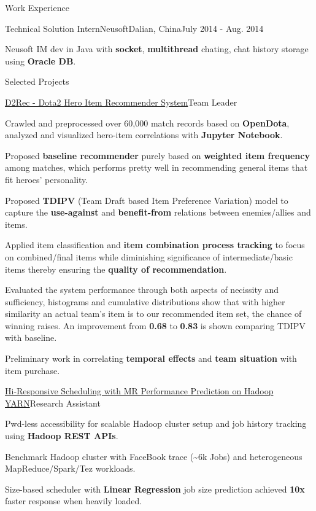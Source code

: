 \documentclass{resume} %
\begin{document}
\begin{rSection}{Work Experience}
\begin{rSubsection}{Technical Solution Intern}{Neusoft}{Dalian, China}{July 2014 - Aug. 2014}
\item Neusoft IM dev in Java with \textbf{socket}, \textbf{multithread} chating, chat history storage using \textbf{Oracle DB}.
\end{rSubsection}
\end{rSection}



\begin{rSection}{Selected Projects}
\begin{rSubsection}{\href{http://dota2rec.github.io}{D2Rec - Dota2 Hero Item Recommender System}}{Team Leader}{}{}
\item Crawled and preprocessed over 60,000 match records based on {\bf OpenDota}, analyzed and visualized hero-item correlations with {\bf Jupyter Notebook}.
\item Proposed {\bf baseline recommender} purely based on {\bf weighted item frequency} among matches, which performs pretty well in recommending general items that fit heroes' personality.
\item Proposed {\bf TDIPV} (Team Draft based Item Preference Variation) model to capture the {\bf use-against} and {\bf benefit-from} relations between enemies/allies and items.
\item Applied item classification and {\bf item combination process tracking} to focus on combined/final items while diminishing significance of intermediate/basic items thereby ensuring the {\bf quality of recommendation}.
\item Evaluated the system performance through both aspects of necissity and sufficiency, histograms and cumulative distributions show that with higher similarity an actual team's item is to our recommended item set, the chance of winning raises. An improvement from {\bf 0.68} to {\bf 0.83} is shown comparing TDIPV with baseline.
\item Preliminary work in correlating {\bf temporal effects} and {\bf team situation} with item purchase.
\end{rSubsection}

\begin{rSubsection}{\href{http://ieeexplore.ieee.org/document/7579961/}{Hi-Responsive Scheduling with MR Performance Prediction on Hadoop YARN}}{Research Assistant}{}{}
\item Pwd-less accessibility for scalable Hadoop cluster setup and job history tracking using \textbf{Hadoop REST APIs}.
\item Benchmark Hadoop cluster with FaceBook trace (\textasciitilde 6k Jobs) and heterogeneous MapReduce/Spark/Tez workloads. 
\item Size-based scheduler with \textbf{Linear Regression} job size prediction achieved \textbf{10x} faster response when heavily loaded.
\end{rSubsection}


\end{rSection}
\end{document}
